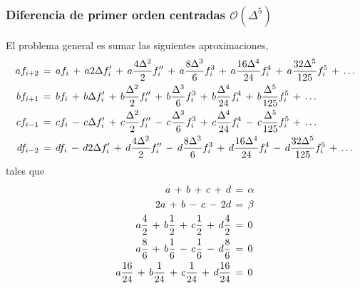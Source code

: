 \documentclass[9pt,technote,twoside,letterpaper,twocolumn]{IEEEtran}
\begin{document}
\subsubsection{Diferencia de primer orden centradas $\mathcal{O}(\Delta^5)$}
\label{sec:dif1D2Od}
El problema general es sumar las siguientes aproximaciones,
{\tiny
  \begin{align}
    af_{i+2}&\,=\,af_i
              \,+\,a2\Delta f'_i
              \,+\,a\frac{4\Delta^2}{2}f''_i
              \,+\,a\frac{8\Delta^3}{6}f^3_i
              \,+\,a\frac{16\Delta^4}{24}f^4_i
              \,+\,a\frac{32\Delta^5}{125}f^5_i  
              \,+\,\ldots  
              \notag\\
    bf_{i+1}&\,=\,bf_i
              \,+\,b\Delta f'_i
              \,+\,b\frac{\Delta^2}{2}f''_i
              \,+\,b\frac{\Delta^3}{6}f^3_i
              \,+\,b\frac{\Delta^4}{24}f^4_i
              \,+\,b\frac{\Delta^5}{125}f^5_i  
              \,+\,\ldots  
              \notag\\
    cf_{i-1}&\,=\,cf_i
               \,-\,c\Delta f'_i
               \,+\,c\frac{\Delta^2}{2}f''_i
               \,-\,c\frac{\Delta^3}{6}f^3_i
               \,+\,c\frac{\Delta^4}{24}f^4_i
               \,-\,c\frac{\Delta^5}{125}f^5_i  
               \,+\,\ldots  
               \notag\\
    df_{i-2}&\,=\,df_i
             \,-\,d2\Delta f'_i
             \,+\,d\frac{4\Delta^2}{2}f''_i
             \,-\,d\frac{8\Delta^3}{6}f^3_i
             \,+\,d\frac{16\Delta^4}{24}f^4_i
             \,-\,d\frac{32\Delta^5}{125}f^5_i  
             \,+\,\ldots
             \notag
  \end{align}
}
tales que
{%
  \begin{align}
    a
    \,+\,b
    \,+\,c
    \,+\,d
    &\,=\,\alpha \notag\\
    2a
    \,+\, b
    \,-\, c
    \,-\,2d
    &\,=\,\beta \notag\\
    a\frac{4}{2}
    \,+\,b\frac{1}{2}
    \,+\,c\frac{1}{2}
    \,+\,d\frac{4}{2}
                         &\,=\,0 \notag\\
    a\frac{8}{6}
    \,+\,b\frac{1}{6}
    \,-\,c\frac{1}{6}
    \,-\,d\frac{8}{6}
                         &\,=\,0 \notag\\  
    a\frac{16}{24}
    \,+\,b\frac{1}{24}
    \,+\,c\frac{1}{24}
    \,+\,d\frac{16}{24}
                         &\,=\,0 \notag
  \end{align}
}
\end{document}
